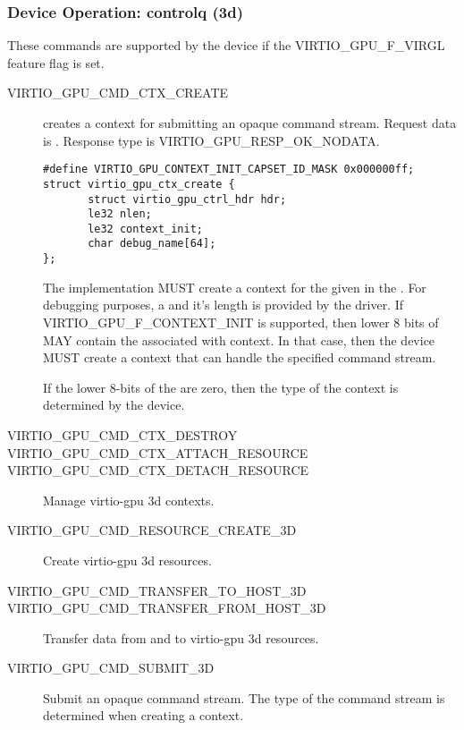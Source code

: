 \subsubsection{Device Operation: controlq (3d)}\label{sec:Device Types / GPU Device / Device Operation / Device Operation: controlq (3d)}

These commands are supported by the device if the VIRTIO_GPU_F_VIRGL
feature flag is set.

\begin{description}

\item[VIRTIO_GPU_CMD_CTX_CREATE] creates a context for submitting an opaque
  command stream.  Request data is .
  Response type is VIRTIO_GPU_RESP_OK_NODATA.

\begin{lstlisting}
#define VIRTIO_GPU_CONTEXT_INIT_CAPSET_ID_MASK 0x000000ff;
struct virtio_gpu_ctx_create {
       struct virtio_gpu_ctrl_hdr hdr;
       le32 nlen;
       le32 context_init;
       char debug_name[64];
};
\end{lstlisting}

The implementation MUST create a context for the given  in
the .  For debugging purposes, a  and it's
length  is provided by the driver.  If
VIRTIO_GPU_F_CONTEXT_INIT is supported, then lower 8 bits of
 MAY contain the  associated with
context.  In that case, then the device MUST create a context that can
handle the specified command stream.

If the lower 8-bits of the  are zero, then the type of
the context is determined by the device.

\item[VIRTIO_GPU_CMD_CTX_DESTROY]
\item[VIRTIO_GPU_CMD_CTX_ATTACH_RESOURCE]
\item[VIRTIO_GPU_CMD_CTX_DETACH_RESOURCE]
  Manage virtio-gpu 3d contexts.

\item[VIRTIO_GPU_CMD_RESOURCE_CREATE_3D]
  Create virtio-gpu 3d resources.

\item[VIRTIO_GPU_CMD_TRANSFER_TO_HOST_3D]
\item[VIRTIO_GPU_CMD_TRANSFER_FROM_HOST_3D]
  Transfer data from and to virtio-gpu 3d resources.

\item[VIRTIO_GPU_CMD_SUBMIT_3D]
  Submit an opaque command stream.  The type of the command stream is
  determined when creating a context.


\end{description}
